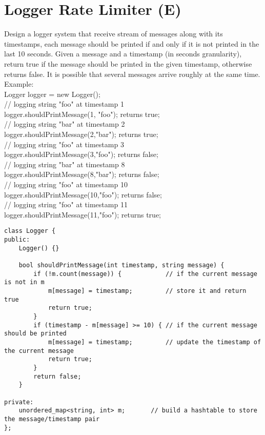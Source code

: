 \section{Logger Rate Limiter (E)}
Design a logger system that receive stream of messages along with its timestamps, each message should be printed if and only if it is not printed in the last 10 seconds. Given a message and a timestamp (in seconds granularity), return true if the message should be printed in the given timestamp, otherwise returns false. It is possible that several messages arrive roughly at the same time.\\

Example:\\
Logger logger = new Logger();\\

// logging string "foo" at timestamp 1\\
logger.shouldPrintMessage(1, "foo"); returns true;\\

// logging string "bar" at timestamp 2\\
logger.shouldPrintMessage(2,"bar"); returns true;\\

// logging string "foo" at timestamp 3\\
logger.shouldPrintMessage(3,"foo"); returns false;\\

// logging string "bar" at timestamp 8\\
logger.shouldPrintMessage(8,"bar"); returns false;\\

// logging string "foo" at timestamp 10\\
logger.shouldPrintMessage(10,"foo"); returns false;\\

// logging string "foo" at timestamp 11\\
logger.shouldPrintMessage(11,"foo"); returns true;\\

\begin{lstlisting}
class Logger {
public:
    Logger() {}
    
    bool shouldPrintMessage(int timestamp, string message) {
        if (!m.count(message)) {            // if the current message is not in m
            m[message] = timestamp;         // store it and return true
            return true;
        } 
        if (timestamp - m[message] >= 10) { // if the current message should be printed
            m[message] = timestamp;         // update the timestamp of the current message
            return true;
        }
        return false;
    }

private:
    unordered_map<string, int> m;       // build a hashtable to store the message/timestamp pair
};
\end{lstlisting}


